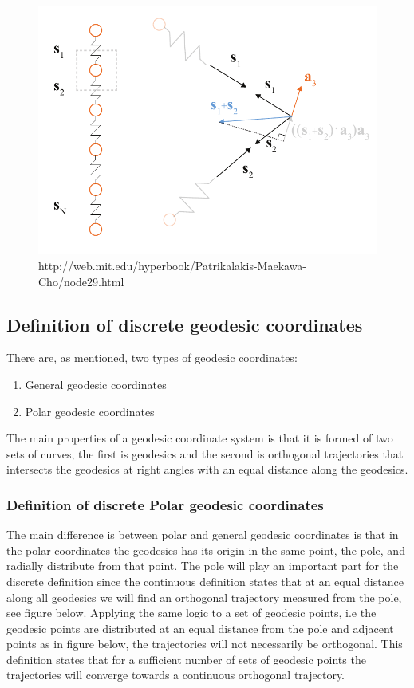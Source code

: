 \begin{figure}[H]
\centering
\includegraphics[width = 0.8\linewidth ]{figure/Method/GeodesicDR.pdf}
\caption{http://web.mit.edu/hyperbook/Patrikalakis-Maekawa-Cho/node29.html}
\end{figure}

\subsection{Definition of discrete geodesic coordinates}

There are, as mentioned, two types of geodesic coordinates:

\begin{enumerate}
\item General geodesic coordinates
\item Polar geodesic coordinates
\end{enumerate}

The main properties of a geodesic coordinate system is that it is formed of two sets of curves, the first is geodesics and the second is orthogonal trajectories that intersects the geodesics at right angles with an equal distance along the geodesics.

\vspace{5mm}

\subsubsection{Definition of discrete Polar geodesic coordinates}

The main difference is between polar and general geodesic coordinates is that in the polar coordinates the geodesics has its origin in the same point, the pole, and radially distribute from that point. The pole will play an important part for the discrete definition since the continuous definition states that at an equal distance along all geodesics we will find an orthogonal trajectory measured from the pole, see figure below.  Applying the same logic to a set of geodesic points, i.e the geodesic points are distributed at an equal distance from the pole and adjacent points as in figure below, the trajectories will not necessarily be orthogonal. This definition states that for a sufficient number of sets of geodesic points the trajectories will converge towards a continuous orthogonal trajectory. 

